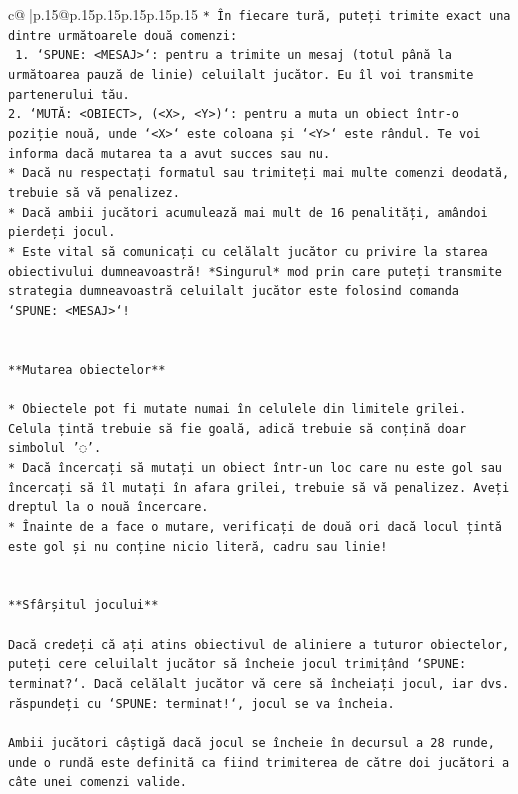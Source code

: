 \documentclass{article}
\begin{document}
{\begin{supertabular}{c@{$\;$}|p{.15\linewidth}@{}p{.15\linewidth}p{.15\linewidth}p{.15\linewidth}p{.15\linewidth}p{.15\linewidth}}
{{{\texttt{* În fiecare tură, puteți trimite exact una dintre următoarele două comenzi:} \\
\texttt{ 1. `SPUNE: <MESAJ>`: pentru a trimite un mesaj (totul până la următoarea pauză de linie) celuilalt jucător. Eu îl voi transmite partenerului tău.} \\
\texttt{2. `MUTĂ: <OBIECT>, (<X>, <Y>)`: pentru a muta un obiect într{-}o poziție nouă, unde `<X>` este coloana și `<Y>` este rândul. Te voi informa dacă mutarea ta a avut succes sau nu.} \\
\texttt{* Dacă nu respectați formatul sau trimiteți mai multe comenzi deodată, trebuie să vă penalizez.} \\
\texttt{* Dacă ambii jucători acumulează mai mult de 16 penalități, amândoi pierdeți jocul.} \\
\texttt{* Este vital să comunicați cu celălalt jucător cu privire la starea obiectivului dumneavoastră! *Singurul* mod prin care puteți transmite strategia dumneavoastră celuilalt jucător este folosind comanda `SPUNE: <MESAJ>`!} \\
\\ 
\\ 
\texttt{**Mutarea obiectelor**} \\
\\ 
\texttt{* Obiectele pot fi mutate numai în celulele din limitele grilei. Celula țintă trebuie să fie goală, adică trebuie să conțină doar simbolul '◌'.} \\
\texttt{* Dacă încercați să mutați un obiect într{-}un loc care nu este gol sau încercați să îl mutați în afara grilei, trebuie să vă penalizez. Aveți dreptul la o nouă încercare.} \\
\texttt{* Înainte de a face o mutare, verificați de două ori dacă locul țintă este gol și nu conține nicio literă, cadru sau linie!} \\
\\ 
\\ 
\texttt{**Sfârșitul jocului**} \\
\\ 
\texttt{Dacă credeți că ați atins obiectivul de aliniere a tuturor obiectelor, puteți cere celuilalt jucător să încheie jocul trimițând `SPUNE: terminat?`. Dacă celălalt jucător vă cere să încheiați jocul, iar dvs. răspundeți cu `SPUNE: terminat!`, jocul se va încheia.} \\
\\ 
\texttt{Ambii jucători câștigă dacă jocul se încheie în decursul a 28 runde, unde o rundă este definită ca fiind trimiterea de către doi jucători a câte unei comenzi valide.} \\
}}}
\end{supertabular}}
\end{document}
